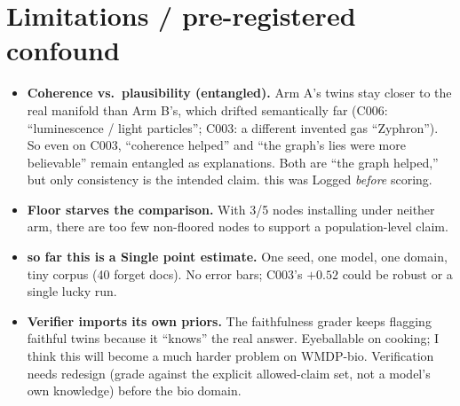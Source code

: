\documentclass[11pt]{article}
\begin{document}
\section{Limitations / pre-registered confound}\label{sec:limits}
\begin{itemize}
  \item \textbf{Coherence vs.\ plausibility (entangled).} Arm A's twins stay closer
        to the real manifold than Arm B's, which drifted semantically far
        (C006: ``luminescence / light particles''; C003: a different invented gas
        ``Zyphron''). So even on C003, ``coherence helped'' and ``the graph's lies
        were more believable'' remain entangled as explanations. Both are ``the
        graph helped,'' but only consistency is the intended claim. this was Logged
        \emph{before} scoring.
  \item \textbf{Floor starves the comparison.} With 3/5 nodes installing under
        neither arm, there are too few non-floored nodes to support a
        population-level claim.
  \item \textbf{so far this is a Single point estimate.} One seed, one model, one domain, tiny
        corpus (40 forget docs). No error bars; C003's $+0.52$ could be robust or a
        single lucky run.
  \item \textbf{Verifier imports its own priors.} The faithfulness grader keeps
        flagging faithful twins because it ``knows'' the real answer. Eyeballable on
        cooking; I think this will become a much harder problem on WMDP-bio. Verification needs redesign
        (grade against the explicit allowed-claim set, not a model's own knowledge)
        before the bio domain.
\end{itemize}
\end{document}
